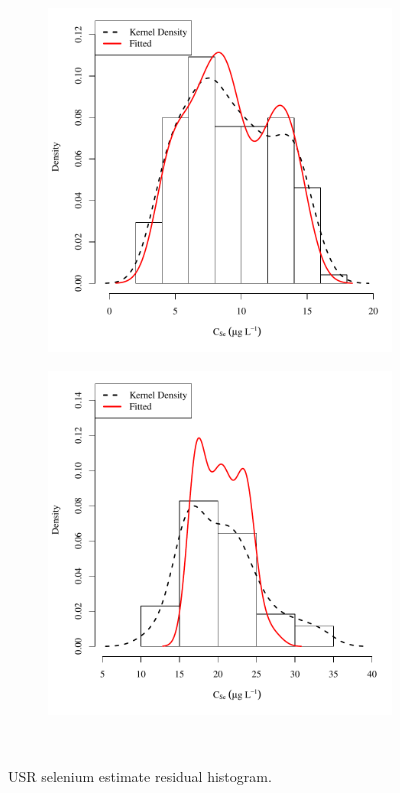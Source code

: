 \subfiguremid
\begin{landscape}
	\begin{figure}
		\begin{subfigure}{0.7\textwidth}
			\centering
			\includegraphics[width=\tableCustomSize]{"Figures/Results_USR/Stochastic/Conc Model ResDist UDIV"}
		\end{subfigure}%
		\begin{subfigure}{0.7\textwidth}
			\centering
			\includegraphics[width=\tableCustomSize]{"Figures/Results_USR/Stochastic/Conc Model ResDist WTP"}
		\end{subfigure}\\
		\caption{USR selenium estimate residual histogram.}
	\end{figure}
\end{landscape}


